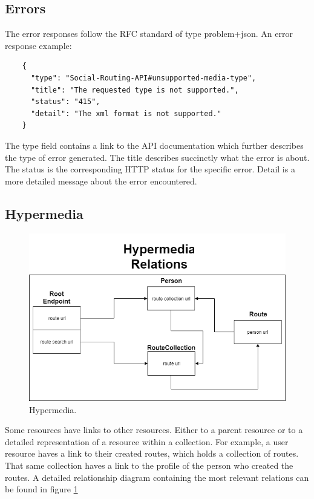     \subsection{Errors}
    The error responses follow the RFC standard of type problem+json\cite{jsonproblemonlinedocs}. An error response example:
    
    \begin{lstlisting}
    {
      "type": "Social-Routing-API#unsupported-media-type",
      "title": "The requested type is not supported.",
      "status": "415",
      "detail": "The xml format is not supported."
    }
    \end{lstlisting}

    The type field contains a link to the API documentation which further describes the type of error generated.
    The title describes succinctly what the error is about.
    The status is the corresponding HTTP status for the specific error.
    Detail is a more detailed message about the error encountered.

    \subsection{Hypermedia}
    
    \begin{figure}[H]            
        \includegraphics[width=\textwidth]{images/project-structure/hypermedia-relations.PNG}
        \caption{Hypermedia.}
        \label{fig:hypermedia-relations}
    \end{figure}   

    Some resources have links to other resources. Either to a parent resource or to a detailed representation of a 
    resource within a collection. For example, a user resource haves a link to their created routes, which 
    holds a collection of routes. That same collection haves a link to the profile of the person who created 
    the routes. A detailed relationship diagram containing the most relevant relations can be found in figure \ref{fig:hypermedia-relations} 
    
